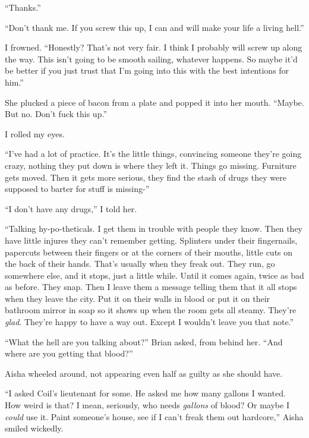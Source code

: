 ``Thanks.''



``Don't thank me.  If you screw this up, I can and will make your life a living hell.''



I frowned.  ``Honestly?  That's not very fair.  I think I probably will screw up along the way.  This isn't going to be smooth sailing, whatever happens.  So maybe it'd be better if you just trust that I'm going into this with the best intentions for him.''



She plucked a piece of bacon from a plate and popped it into her mouth.  ``Maybe.  But no. Don't fuck this up.''



I rolled my eyes.



``I've had a lot of practice.  It's the little things, convincing someone they're going crazy, nothing they put down is where they left it.  Things go missing.  Furniture gets moved.  Then it gets more serious, they find the stash of drugs they were supposed to barter for stuff is missing-''



``I don't have any drugs,'' I told her.



``Talking hy-po-theticals.  I get them in trouble with people they know.  Then they have little injures they can't remember getting.  Splinters under their fingernails, papercuts between their fingers or at the corners of their mouths, little cuts on the back of their hands.  That's usually when they freak out.  They run, go somewhere else, and it stops, just a little while.  Until it comes again, twice as bad as before.  They snap.  Then I leave them a message telling them that it all stops when they leave the city.  Put it on their walls in blood or put it on their bathroom mirror in soap so it shows up when the room gets all steamy.  They're \emph{glad}.  They're happy to have a way out.  Except I wouldn't leave you that note.''



``What the hell are you talking about?'' Brian asked, from behind her.  ``And where are you getting that blood?''



Aisha wheeled around, not appearing even half as guilty as she should have.



``I asked Coil's lieutenant for some.  He asked me how many gallons I wanted.  How weird is that?  I mean, seriously, who needs \emph{gallons} of blood?  Or maybe I \emph{could} use it.  Paint someone's house, see if I can't freak them out hardcore,'' Aisha smiled wickedly.



